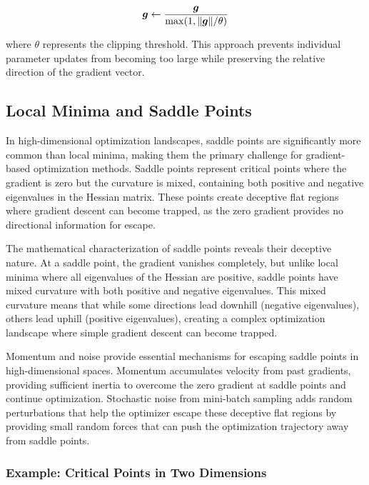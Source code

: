 \begin{equation}
\boldsymbol{g} \leftarrow \frac{\boldsymbol{g}}{\max(1, \|\boldsymbol{g}\| / \theta)}
\end{equation}

where $\theta$ represents the clipping threshold. This approach prevents individual parameter updates from becoming too large while preserving the relative direction of the gradient vector.

\subsection{Local Minima and Saddle Points}

In high-dimensional optimization landscapes, saddle points are significantly more common than local minima, making them the primary challenge for gradient-based optimization methods. Saddle points represent critical points where the gradient is zero but the curvature is mixed, containing both positive and negative eigenvalues in the Hessian matrix. These points create deceptive flat regions where gradient descent can become trapped, as the zero gradient provides no directional information for escape.

The mathematical characterization of saddle points reveals their deceptive nature. At a saddle point, the gradient vanishes completely, but unlike local minima where all eigenvalues of the Hessian are positive, saddle points have mixed curvature with both positive and negative eigenvalues. This mixed curvature means that while some directions lead downhill (negative eigenvalues), others lead uphill (positive eigenvalues), creating a complex optimization landscape where simple gradient descent can become trapped.

Momentum and noise provide essential mechanisms for escaping saddle points in high-dimensional spaces. Momentum accumulates velocity from past gradients, providing sufficient inertia to overcome the zero gradient at saddle points and continue optimization. Stochastic noise from mini-batch sampling adds random perturbations that help the optimizer escape these deceptive flat regions by providing small random forces that can push the optimization trajectory away from saddle points.

\subsubsection{Example: Critical Points in Two Dimensions}

